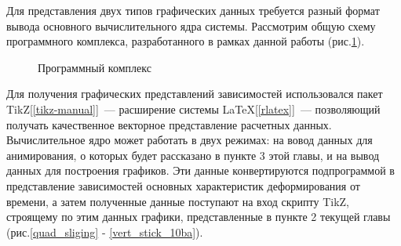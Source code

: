 Для представления двух типов графических данных требуется разный формат вывода основного вычислительного ядра системы.
Рассмотрим общую схему программного комплекса, разработанного в рамках данной работы (рис.\ref{programm}).
\begin{figure}[h!]  	
				\def\svgwidth{\columnwidth}
			\caption{ Программный комплекс } 
\label{programm}
 \end{figure}
 
 Для получения графических представлений зависимостей использовался пакет TikZ[\ref{tikz-manual}]~--- расширение системы \LaTeX [\ref{rlatex}]~---
 позволяющий получать качественное векторное представление расчетных данных. 
 Вычислительное ядро может работать в двух режимах: на вовод данных для анимирования, о которых будет рассказано в пункте 3 этой главы, и на вывод данных для построения графиков. Эти данные конвертируются подпрограммой в представление зависимостей основных характеристик деформирования от времени, а затем полученные данные поступают на вход скрипту TikZ, строящему по этим данных графики, представленные в пункте 2 текущей главы (рис.\ref{quad_sliging} - \ref{vert_stick_10ba}).
 
